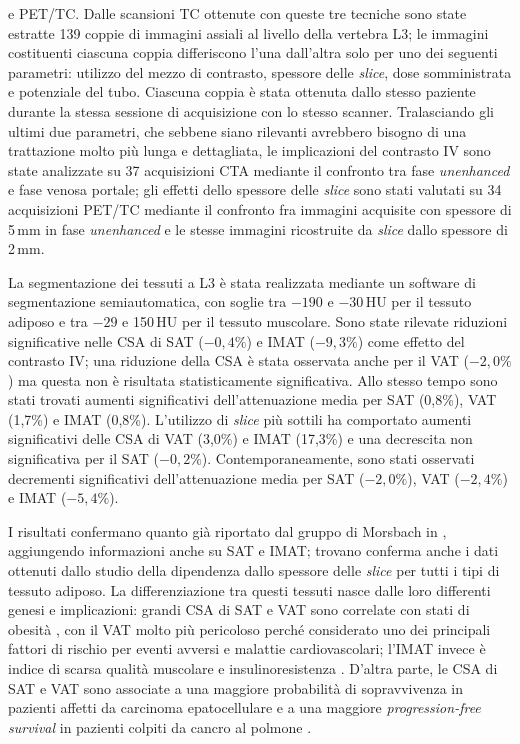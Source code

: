 e PET/TC. Dalle scansioni TC ottenute con queste tre tecniche sono state estratte 139 coppie di immagini assiali al livello della vertebra L3; le immagini costituenti ciascuna coppia differiscono l’una dall'altra solo per uno dei seguenti parametri: utilizzo del mezzo di contrasto, spessore delle \textit{slice}, dose somministrata e potenziale del tubo. Ciascuna coppia è stata ottenuta dallo stesso paziente durante la stessa sessione di acquisizione con lo stesso scanner. Tralasciando gli ultimi due parametri, che sebbene siano rilevanti avrebbero bisogno di una trattazione molto più lunga e dettagliata, le implicazioni del contrasto IV sono state analizzate su 37 acquisizioni CTA mediante il confronto tra fase \textit{unenhanced} e fase venosa portale; gli effetti dello spessore delle \textit{slice} sono stati valutati su 34 acquisizioni PET/TC mediante il confronto fra immagini acquisite con spessore di 5\,mm in fase \textit{unenhanced} e le stesse immagini ricostruite da \textit{slice} dallo spessore di 2\,mm.

La segmentazione dei tessuti a L3 è stata realizzata mediante un software di segmentazione semiautomatica, con soglie tra $-190$ e $-30$\,HU per il tessuto adiposo e tra $-29$ e 150\,HU per il tessuto muscolare. Sono state rilevate riduzioni significative nelle CSA di SAT ($-0,4\%$) e IMAT ($-9,3\%$) come effetto del contrasto IV; una riduzione della CSA è stata osservata anche per il VAT ($-2,0\%$) ma questa non è risultata statisticamente significativa. Allo stesso tempo sono stati trovati aumenti significativi dell'attenuazione media per SAT (0,8\%), VAT (1,7\%) e IMAT (0,8\%). L’utilizzo di \textit{slice} più sottili ha comportato aumenti significativi delle CSA di VAT (3,0\%) e IMAT (17,3\%) e una decrescita non significativa per il SAT ($-0,2\%$). Contemporaneamente, sono stati osservati decrementi significativi dell'attenuazione media per SAT ($-2,0\%$), VAT ($-2,4\%$) e IMAT ($-5,4\%$).

I risultati confermano quanto già riportato dal gruppo di Morsbach in \cite{Morsbach2019}, aggiungendo informazioni anche su SAT e IMAT; trovano conferma anche i dati ottenuti dallo studio della dipendenza dallo spessore delle \textit{slice} per tutti i tipi di tessuto adiposo. La differenziazione tra questi tessuti nasce dalle loro differenti genesi e implicazioni: grandi CSA di SAT e VAT sono correlate con stati di obesità \cite{Troschel2020, Troschel2021}, con il VAT molto più pericoloso perché considerato uno dei principali fattori di rischio per eventi avversi e malattie cardiovascolari; l’IMAT invece è indice di scarsa qualità muscolare \cite{Reinders2015, Troschel2021} e insulinoresistenza \cite{Goodpaster2000, Troschel2021}. D’altra parte, le CSA di SAT e VAT sono associate a una maggiore probabilità di sopravvivenza in pazienti affetti da carcinoma epatocellulare \cite{Fujiwara2015, Troschel2021} e a una maggiore \textit{progression-free survival} in pazienti colpiti da cancro al polmone \cite{Nattenmüller2017, Troschel2021}.

